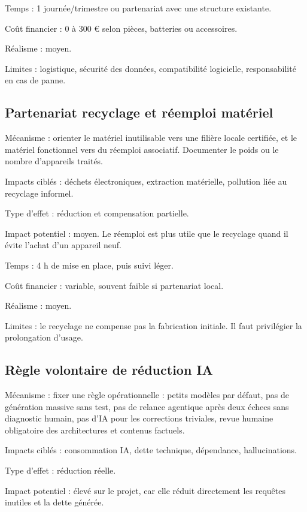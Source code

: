 \documentclass[
  10pt,
  a4paper,
  DIV=11,
  numbers=noendperiod,
  oneside]{scrreprt}
\begin{document}
Temps : 1 journée/trimestre ou partenariat avec une structure existante.

Coût financier : 0 à 300 € selon pièces, batteries ou accessoires.

Réalisme : moyen.

Limites : logistique, sécurité des données, compatibilité logicielle,
responsabilité en cas de panne.

\subsection{Partenariat recyclage et réemploi
matériel}\label{partenariat-recyclage-et-ruxe9emploi-matuxe9riel}

Mécanisme : orienter le matériel inutilisable vers une filière locale
certifiée, et le matériel fonctionnel vers du réemploi associatif.
Documenter le poids ou le nombre d'appareils traités.

Impacts ciblés : déchets électroniques, extraction matérielle, pollution
liée au recyclage informel.

Type d'effet : réduction et compensation partielle.

Impact potentiel : moyen. Le réemploi est plus utile que le recyclage
quand il évite l'achat d'un appareil neuf.

Temps : 4 h de mise en place, puis suivi léger.

Coût financier : variable, souvent faible si partenariat local.

Réalisme : moyen.

Limites : le recyclage ne compense pas la fabrication initiale. Il faut
privilégier la prolongation d'usage.

\subsection{Règle volontaire de réduction
IA}\label{ruxe8gle-volontaire-de-ruxe9duction-ia}

Mécanisme : fixer une règle opérationnelle : petits modèles par défaut,
pas de génération massive sans test, pas de relance agentique après deux
échecs sans diagnostic humain, pas d'IA pour les corrections triviales,
revue humaine obligatoire des architectures et contenus factuels.

Impacts ciblés : consommation IA, dette technique, dépendance,
hallucinations.

Type d'effet : réduction réelle.

Impact potentiel : élevé sur le projet, car elle réduit directement les
requêtes inutiles et la dette générée.
\end{document}
